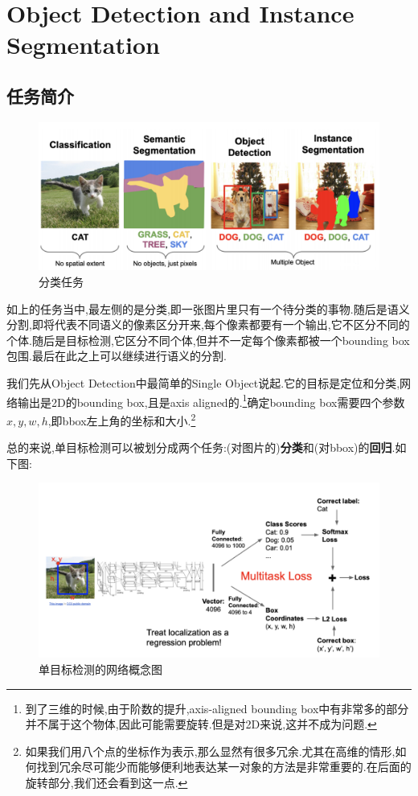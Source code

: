 \section{Object Detection and Instance Segmentation}

\subsection{任务简介}

\begin{figure}[htbp]
    \centering
    \includegraphics[scale=0.55]{figures/cv_tasks.png}
    \caption{分类任务}
\end{figure}

如上的任务当中,最左侧的是分类,即一张图片里只有一个待分类的事物.随后是语义分割,即将代表不同语义的像素区分开来,每个像素都要有一个输出,它不区分不同的个体.随后是目标检测,它区分不同个体,但并不一定每个像素都被一个bounding box包围.最后在此之上可以继续进行语义的分割.

我们先从Object Detection中最简单的Single Object说起.它的目标是定位和分类,网络输出是2D的bounding box,且是axis aligned的.\footnote{到了三维的时候,由于阶数的提升,axis-aligned bounding box中有非常多的部分并不属于这个物体,因此可能需要旋转.但是对2D来说,这并不成为问题.}确定bounding box需要四个参数$x, y, w, h$,即bbox左上角的坐标和大小.\footnote{如果我们用八个点的坐标作为表示,那么显然有很多冗余.尤其在高维的情形,如何找到冗余尽可能少而能够便利地表达某一对象的方法是非常重要的.在后面的旋转部分,我们还会看到这一点.}

总的来说,单目标检测可以被划分成两个任务:(对图片的)\textbf{分类}和(对bbox)的\textbf{回归}.如下图:

\begin{figure}[htbp]
    \centering
    \includegraphics[scale=0.55]{figures/single_obj_det.png}
    \caption{单目标检测的网络概念图}
\end{figure}

